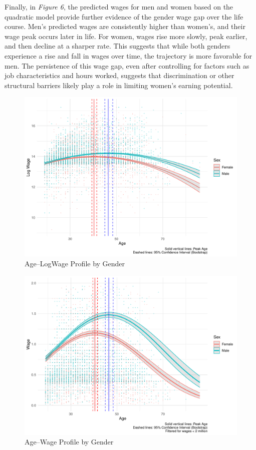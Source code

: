 \documentclass[11pt,a4paper,onecolumn]{article}
\begin{document}
        Finally, in \textit{Figure 6}, the predicted wages for men and women based on the quadratic model provide further evidence of the gender wage gap over the life course. Men's predicted wages are consistently higher than women's, and their wage peak occurs later in life. For women, wages rise more slowly, peak earlier, and then decline at a sharper rate. This suggests that while both genders experience a rise and fall in wages over time, the trajectory is more favorable for men. The persistence of this wage gap, even after controlling for factors such as job characteristics and hours worked, suggests that discrimination or other structural barriers likely play a role in limiting women’s earning potential.        
    
        \begin{figure}[H]
            \includegraphics[scale=0.6]{../views/P4_age_logw_sex_profile.pdf}   
            \caption{Age--LogWage Profile by Gender} \label{fig:P4}
        \end{figure}
    
        \begin{figure}[H]
            \includegraphics[scale=0.6]{../views/P5_age_wage_sex_profile.pdf}   
            \caption{Age--Wage Profile by Gender} \label{fig:P5}
        \end{figure}
    
\end{document}
